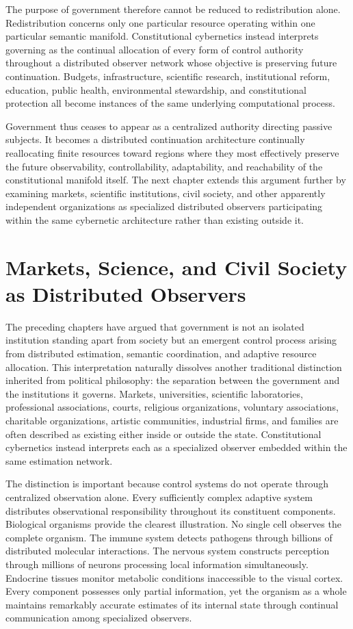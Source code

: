 \documentclass[12pt,a4paper]{article}
\begin{document}
The purpose of government therefore cannot be reduced to redistribution alone. Redistribution concerns only one particular resource operating within one particular semantic manifold. Constitutional cybernetics instead interprets governing as the continual allocation of every form of control authority throughout a distributed observer network whose objective is preserving future continuation. Budgets, infrastructure, scientific research, institutional reform, education, public health, environmental stewardship, and constitutional protection all become instances of the same underlying computational process.

Government thus ceases to appear as a centralized authority directing passive subjects. It becomes a distributed continuation architecture continually reallocating finite resources toward regions where they most effectively preserve the future observability, controllability, adaptability, and reachability of the constitutional manifold itself. The next chapter extends this argument further by examining markets, scientific institutions, civil society, and other apparently independent organizations as specialized distributed observers participating within the same cybernetic architecture rather than existing outside it.

\section{Markets, Science, and Civil Society as Distributed Observers}

The preceding chapters have argued that government is not an isolated institution standing apart from society but an emergent control process arising from distributed estimation, semantic coordination, and adaptive resource allocation. This interpretation naturally dissolves another traditional distinction inherited from political philosophy: the separation between the government and the institutions it governs. Markets, universities, scientific laboratories, professional associations, courts, religious organizations, voluntary associations, charitable organizations, artistic communities, industrial firms, and families are often described as existing either inside or outside the state. Constitutional cybernetics instead interprets each as a specialized observer embedded within the same estimation network.

The distinction is important because control systems do not operate through centralized observation alone. Every sufficiently complex adaptive system distributes observational responsibility throughout its constituent components. Biological organisms provide the clearest illustration. No single cell observes the complete organism. The immune system detects pathogens through billions of distributed molecular interactions. The nervous system constructs perception through millions of neurons processing local information simultaneously. Endocrine tissues monitor metabolic conditions inaccessible to the visual cortex. Every component possesses only partial information, yet the organism as a whole maintains remarkably accurate estimates of its internal state through continual communication among specialized observers.
\end{document}
